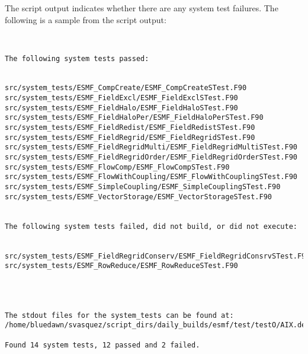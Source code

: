 The script output indicates whether there are any system test failures.
The following is a sample from the script output:

\begin{verbatim}


The following system tests passed:


src/system_tests/ESMF_CompCreate/ESMF_CompCreateSTest.F90
src/system_tests/ESMF_FieldExcl/ESMF_FieldExclSTest.F90
src/system_tests/ESMF_FieldHalo/ESMF_FieldHaloSTest.F90
src/system_tests/ESMF_FieldHaloPer/ESMF_FieldHaloPerSTest.F90
src/system_tests/ESMF_FieldRedist/ESMF_FieldRedistSTest.F90
src/system_tests/ESMF_FieldRegrid/ESMF_FieldRegridSTest.F90
src/system_tests/ESMF_FieldRegridMulti/ESMF_FieldRegridMultiSTest.F90
src/system_tests/ESMF_FieldRegridOrder/ESMF_FieldRegridOrderSTest.F90
src/system_tests/ESMF_FlowComp/ESMF_FlowCompSTest.F90
src/system_tests/ESMF_FlowWithCoupling/ESMF_FlowWithCouplingSTest.F90
src/system_tests/ESMF_SimpleCoupling/ESMF_SimpleCouplingSTest.F90
src/system_tests/ESMF_VectorStorage/ESMF_VectorStorageSTest.F90


The following system tests failed, did not build, or did not execute:


src/system_tests/ESMF_FieldRegridConserv/ESMF_FieldRegridConsrvSTest.F90
src/system_tests/ESMF_RowReduce/ESMF_RowReduceSTest.F90




The stdout files for the system_tests can be found at:
/home/bluedawn/svasquez/script_dirs/daily_builds/esmf/test/testO/AIX.default.64.default

Found 14 system tests, 12 passed and 2 failed.


\end{verbatim}

